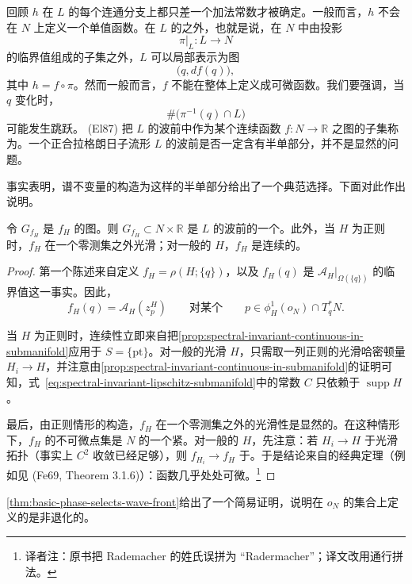 回顾 $h$ 在 $L$ 的每个连通分支上都只差一个加法常数才被确定。一般而言，$h$ 不会在 $N$ 上定义一个单值函数。在 $L$ 的\emph{\termCaustic{}}之外，也就是说，在 $N$ 中由投影
\[
  \pi|_L:L\longrightarrow N
\]
的临界值组成的子集之外，$L$ 可以局部表示为图
\[
  \bigl(q,df(q)\bigr),
\]
其中 $h=f\circ\pi$。然而一般而言，$f$ 不能在整体上定义成可微函数。我们要强调，当 $q$ 变化时，
\[
  \#\bigl(\pi^{-1}(q)\cap L\bigr)
\]
可能发生跳跃。\personEliashberg{} (El87) 把 $L$ 的波前中作为某个连续函数 $f:N\to\mathbb R$ 之图的子集称为\emph{\termSemiSimplePart{}}。一个正合拉格朗日子流形 $L$ 的波前是否一定含有半单部分，并不是显然的问题。

事实表明，谱不变量的构造为这样的半单部分给出了一个典范选择。下面对此作出说明。

\begin{theorem}
\label{thm:basic-phase-selects-wave-front}
令 $G_{f_H}$ 是 $f_H$ 的图。则 $G_{f_H}\subset N\times\mathbb R$ 是 $L$ 的波前的一个\termSemiSimplePart{}。此外，当 $H$ 为\personFloer{}正则时，$f_H$ 在一个零测集之外光滑；对一般的 $H$，$f_H$ 是\personLipschitz{}连续的。
\end{theorem}

\begin{proof}
第一个陈述来自定义 $f_H=\rho(H;\{q\})$，以及 $f_H(q)$ 是 $\mathcal A_H|_{\Omega(\{q\})}$ 的临界值这一事实。因此，
\[
  f_H(q)=\mathcal A_H(z_p^H)
  \qquad\text{对某个}\qquad
  p\in\phi_H^1(o_N)\cap T_q^*N.
\]


当 $H$ 为\personFloer{}正则时，\personLipschitz{}连续性立即来自把\cref{prop:spectral-invariant-continuous-in-submanifold}应用于 $S=\{\mathrm{pt}\}$。对一般的光滑 $H$，只需取一列\personFloer{}正则的光滑哈密顿量 $H_i\to H$，并注意由\cref{prop:spectral-invariant-continuous-in-submanifold}的证明可知，式~\eqref{eq:spectral-invariant-lipschitz-submanifold}中的常数 $C$ 只依赖于 $\operatorname{supp}H$。

最后，由\personFloer{}正则情形的构造，$f_H$ 在一个零测集之外的光滑性是显然的。在这种情形下，$f_H$ 的不可微点集是 $N$ 的一个紧\termStratifiedSubmanifold{}。对一般的 $H$，先注意：若 $H_i\to H$ 于光滑拓扑（事实上 $C^2$ 收敛已经足够），则 $f_{H_i}\to f_H$ 于\termLipschitzTopology{}。于是结论来自\personRademacher{}的经典定理（例如见 (Fe69, Theorem 3.1.6)）：\personLipschitz{}函数几乎处处可微。\footnote{译者注：原书把 Rademacher 的姓氏误拼为 “Radermacher”；译文改用通行拼法。}
\end{proof}

\cref{thm:basic-phase-selects-wave-front}给出了一个简易证明，说明在 $o_N$ 的\termHamiltonianDeformation{}集合上定义的\termHoferDistance{}是非退化的。

